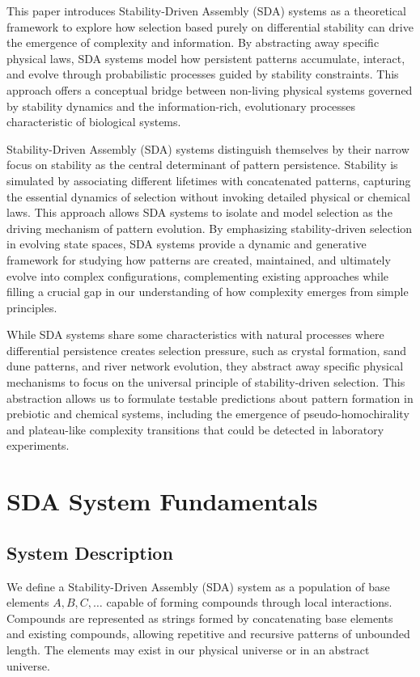 \documentclass[preprint,12pt]{elsarticle}
\begin{document}
This paper introduces Stability-Driven Assembly (SDA) systems as a theoretical framework to explore how selection based purely on differential stability can drive the emergence of complexity and information. By abstracting away specific physical laws, SDA systems model how persistent patterns accumulate, interact, and evolve through probabilistic processes guided by stability constraints. This approach offers a conceptual bridge between non-living physical systems governed by stability dynamics and the information-rich, evolutionary processes characteristic of biological systems.

Stability-Driven Assembly (SDA) systems distinguish themselves by their narrow focus on stability as the central determinant of pattern persistence. Stability is simulated by associating different lifetimes with concatenated patterns, capturing the essential dynamics of selection without invoking detailed physical or chemical laws. This approach allows SDA systems to isolate and model selection as the driving mechanism of pattern evolution. By emphasizing stability-driven selection in evolving state spaces, SDA systems provide a dynamic and generative framework for studying how patterns are created, maintained, and ultimately evolve into complex configurations, complementing existing approaches while filling a crucial gap in our understanding of how complexity emerges from simple principles.

While SDA systems share some characteristics with natural processes where differential persistence creates selection pressure, such as crystal formation, sand dune patterns, and river network evolution, they abstract away specific physical mechanisms to focus on the universal principle of stability-driven selection. This abstraction allows us to formulate testable predictions about pattern formation in prebiotic and chemical systems, including the emergence of pseudo-homochirality and plateau-like complexity transitions that could be detected in laboratory experiments.

\section{SDA System Fundamentals}

\subsection{System Description}

We define a Stability-Driven Assembly (SDA) system as a population of base elements \( A, B, C, \dots \) capable of forming compounds through local interactions. Compounds are represented as strings formed by concatenating base elements and existing compounds, allowing repetitive and recursive patterns of unbounded length. The elements may exist in our physical universe or in an abstract universe. 
\end{document}
